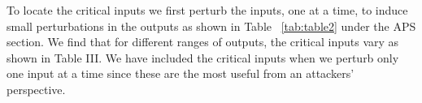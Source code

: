 To locate the critical inputs we first perturb the inputs, one at a time, to induce small perturbations in the outputs as shown in Table ~\ref{tab:table2} under the APS section. We find that for different ranges of outputs, the critical inputs vary as shown in Table III. We have included the critical inputs when we perturb only one input at a time since these are the most useful from an attackers' perspective. 

